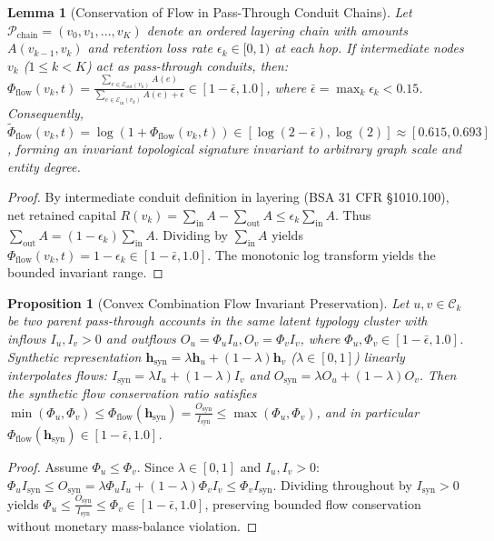 \documentclass[a4paper,fleqn,twocolumn]{article}
\newtheorem{proposition}{Proposition}
\newtheorem{lemma}{Lemma}
\begin{document}
\begin{lemma}[Conservation of Flow in Pass-Through Conduit Chains]
\label{lem:flow_conservation}
Let $\mathcal{P}_{\text{chain}} = (v_0, v_1, \dots, v_K)$ denote an ordered layering chain with amounts $A(v_{k-1}, v_k)$ and retention loss rate $\epsilon_k \in [0, 1)$ at each hop. If intermediate nodes $v_k$ ($1 \le k < K$) act as pass-through conduits, then:
$\Phi_{\text{flow}}(v_k, t) = \frac{\sum_{e \in \mathcal{E}_{\text{out}}(v_k)} A(e)}{\sum_{e \in \mathcal{E}_{\text{in}}(v_k)} A(e) + \epsilon} \in \left[ 1 - \bar{\epsilon}, 1.0 \right]$,
where $\bar{\epsilon} = \max_k \epsilon_k < 0.15$. Consequently, $\tilde{\Phi}_{\text{flow}}(v_k, t) = \log(1 + \Phi_{\text{flow}}(v_k, t)) \in [\log(2 - \bar{\epsilon}), \log(2)] \approx [0.615, 0.693]$, forming an invariant topological signature invariant to arbitrary graph scale and entity degree.
\end{lemma}
\begin{proof}
By intermediate conduit definition in layering (BSA 31 CFR \S 1010.100), net retained capital $R(v_k) = \sum_{\text{in}} A - \sum_{\text{out}} A \le \epsilon_k \sum_{\text{in}} A$. Thus $\sum_{\text{out}} A = (1 - \epsilon_k) \sum_{\text{in}} A$. Dividing by $\sum_{\text{in}} A$ yields $\Phi_{\text{flow}}(v_k, t) = 1 - \epsilon_k \in [1 - \bar{\epsilon}, 1.0]$. The monotonic log transform yields the bounded invariant range.
\end{proof}

\begin{proposition}[Convex Combination Flow Invariant Preservation]
\label{prop:graphsmote_flow_preservation}
Let $u, v \in \mathcal{C}_k$ be two parent pass-through accounts in the same latent typology cluster with inflows $I_u, I_v > 0$ and outflows $O_u = \Phi_u I_u, O_v = \Phi_v I_v$, where $\Phi_u, \Phi_v \in [1 - \bar{\epsilon}, 1.0]$. Synthetic representation $\mathbf{h}_{\text{syn}} = \lambda \mathbf{h}_u + (1 - \lambda) \mathbf{h}_v$ ($\lambda \in [0, 1]$) linearly interpolates flows: $I_{\text{syn}} = \lambda I_u + (1 - \lambda) I_v$ and $O_{\text{syn}} = \lambda O_u + (1 - \lambda) O_v$. Then the synthetic flow conservation ratio satisfies $\min(\Phi_u, \Phi_v) \le \Phi_{\text{flow}}(\mathbf{h}_{\text{syn}}) = \frac{O_{\text{syn}}}{I_{\text{syn}}} \le \max(\Phi_u, \Phi_v)$, and in particular $\Phi_{\text{flow}}(\mathbf{h}_{\text{syn}}) \in [1 - \bar{\epsilon}, 1.0]$.
\end{proposition}
\begin{proof}
Assume $\Phi_u \le \Phi_v$. Since $\lambda \in [0, 1]$ and $I_u, I_v > 0$: $\Phi_u I_{\text{syn}} \le O_{\text{syn}} = \lambda \Phi_u I_u + (1 - \lambda) \Phi_v I_v \le \Phi_v I_{\text{syn}}$. Dividing throughout by $I_{\text{syn}} > 0$ yields $\Phi_u \le \frac{O_{\text{syn}}}{I_{\text{syn}}} \le \Phi_v \in [1 - \bar{\epsilon}, 1.0]$, preserving bounded flow conservation without monetary mass-balance violation.
\end{proof}
\end{document}
